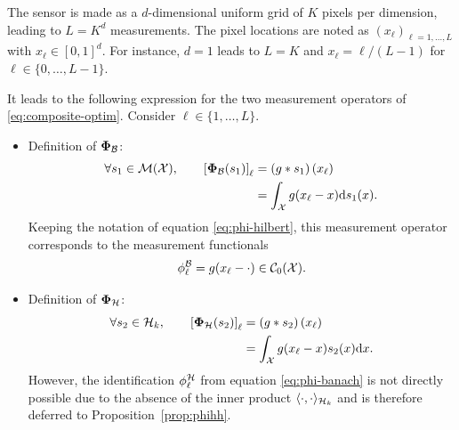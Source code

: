\documentclass[12pt]{article}
\begin{document}
            The sensor is made as a $d$-dimensional uniform grid of $K$ pixels per dimension, leading to $L = K^d$ measurements. The pixel locations are noted as $(x_\ell)_{\ell = 1, \dots, L}$ with $x_\ell \in [0, 1]^d$. For instance, $d=1$ leads to $L=K$ and $x_\ell = {\ell}/({L-1})$ for $\ell \in \{0, \dots, L-1\}$.
        
            It leads to the following expression for the two measurement operators of \eqref{eq:composite-optim}. Consider $\ell \in \{1, \dots, L\}$.
            \begin{itemize}
                \item Definition of $\bm{\Phi}_\mathcal{B}$:
            \begin{equation}
                \label{eq:phib-conv}
                \begin{split}
                \forall s_1 \in {\mathcal{M}}({\mathcal{X}}), \qquad \left[\bm{\Phi}_\mathcal{B}(s_1)\right]_\ell &= \left(g*s_1\right)(x_\ell) \\
                &= \int_{\mathcal{X}} g(x_\ell - x) \mathrm{d}s_1(x).
            \end{split}
            \end{equation}
            Keeping the notation of equation \eqref{eq:phi-hilbert}, this measurement operator corresponds to the measurement functionals
            $$\phi^\mathcal{B}_\ell = g(x_\ell - \cdot) \in {\mathcal{C}}_0({\mathcal{X}}).$$
                \item Definition of $\bm{\Phi}_\mathcal{H}$:
            \begin{equation}
                \label{eq:phih-conv}
                \begin{split}
                \forall s_2 \in \mathcal{H}_k, \qquad\left[\bm{\Phi}_\mathcal{H}(s_2)\right]_\ell &= \left(g*s_2\right)(x_\ell) \\
                &= \int_{\mathcal{X}} g(x_\ell - x) s_2(x) \mathrm{d}x.
                \end{split}
            \end{equation}
            However, the identification $\phi^\mathcal{H}_\ell$ from equation \eqref{eq:phi-banach} is not directly possible due to the absence of the inner product $\langle \cdot, \cdot \rangle_{\mathcal{H}_k}$ and is therefore deferred to Proposition~\ref{prop:phihh}.
            \end{itemize}
\end{document}

